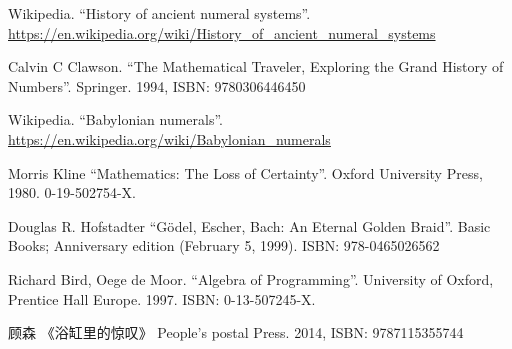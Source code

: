 \documentclass[UTF8]{article}
\begin{document}
\begin{Exercise}
\end{Exercise}

\ifx\wholebook\relax \else
\begin{thebibliography}{99}

Wikipedia. ``History of ancient numeral systems''. \url{https://en.wikipedia.org/wiki/History_of_ancient_numeral_systems}

Calvin C Clawson. ``The Mathematical Traveler, Exploring the Grand History of Numbers''. Springer. 1994, ISBN: 9780306446450

Wikipedia. ``Babylonian numerals''. \url{https://en.wikipedia.org/wiki/Babylonian_numerals}

Morris Kline ``Mathematics: The Loss of Certainty''. Oxford University Press, 1980. 0-19-502754-X.

Douglas R. Hofstadter ``Gödel, Escher, Bach: An Eternal Golden Braid''. Basic Books; Anniversary edition (February 5, 1999). ISBN: 978-0465026562

Richard Bird, Oege de Moor. ``Algebra of Programming''. University of Oxford, Prentice Hall Europe. 1997. ISBN: 0-13-507245-X.

{\fontspec{\cnmainft}顾森 《浴缸里的惊叹》} People's postal Press. 2014, ISBN: 9787115355744

\end{thebibliography}

\expandafter\enddocument

\fi
\end{document}

